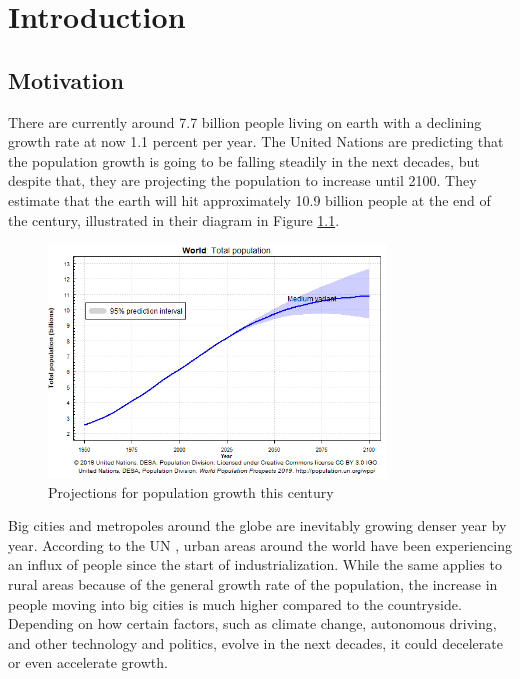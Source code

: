 
\chapter{Introduction}\label{chapter:introduction}
\section{Motivation}

There are currently around 7.7 billion people living on earth with a declining growth rate at now 1.1 percent per year. The United Nations \cite{populationfacts} are predicting that the population growth is going to be falling steadily in the next decades, but despite that, they are projecting the population to increase until 2100. They estimate that the earth will hit approximately 10.9 billion people at the end of the century, illustrated in their diagram in Figure \ref{fig:population}.

\begin{figure}[htpb]
  \centering
  \includegraphics[width=0.8\textwidth]{figures/population.png}
  \caption{Projections for population growth this century \cite{populationdata}}
  \label{fig:population}
\end{figure}

Big cities and metropoles around the globe are inevitably growing denser year by year. According to the UN \cite{populationdata}\cite{growth}, urban areas around the world have been experiencing an influx of people since the start of industrialization. While the same applies to rural areas because of the general growth rate of the population, the increase in people moving into big cities is much higher compared to the countryside.
Depending on how certain factors, such as climate change, autonomous driving, and other technology and politics, evolve in the next decades, it could decelerate or even accelerate growth.

